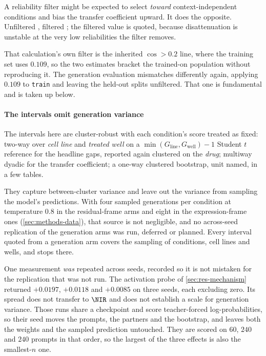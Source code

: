 A reliability filter might be expected to select \emph{toward}
context-in\-de\-pen\-dent conditions and bias the transfer coefficient upward.
It does the opposite. Unfiltered , filtered
; the filtered value is quoted, because disattenuation
is unstable at the very low reliabilities the filter removes.

That calculation's own filter is the inherited $\cos > 0.2$ line, where the
training set uses $0.109$, so the two estimates bracket the trained-on
population without reproducing it. The generation evaluation mismatches
differently again, applying $0.109$ to \texttt{train} and leaving the held-out
splits unfiltered. That one is fundamental and is taken up below.

\paragraph{The intervals omit generation variance} The intervals here are
cluster-robust with each condition's score treated as fixed: two-way over
\emph{cell line} and \emph{treated well} on a $\min(G_{\textrm{line}},
G_{\textrm{well}}) - 1$ Student $t$ reference for the headline gaps, reported
again clustered on the \emph{drug}; multiway dyadic for the transfer
coefficient; a one-way clustered bootstrap, unit named, in a few tables.

They capture between-cluster variance and leave out the variance from sampling
the model's predictions. With four sampled generations per condition at temperature
$0.8$ in the residual-frame arms and eight in the expression-frame ones
(\cref{sec:methods-data}), that source is not negligible, and no across-seed
replication of the generation arms was run, deferred or planned. Every interval
quoted from a generation arm covers the sampling of conditions, cell lines and
wells, and stops there.

One measurement \emph{was} repeated across seeds, recorded so it is not mistaken
for the replication that was not run. The activation probe of
\cref{sec:res-mechanism} returned $+0.0197$, $+0.0118$ and $+0.0085$ on three
seeds, each excluding zero. Its spread does not transfer to $\NIR$ and does not
establish a scale for generation variance. Those runs share a checkpoint and
score teacher-forced log-probabilities, so their seed moves the prompts, the
partners and the bootstrap, and leaves both the weights and the sampled
prediction untouched. They are scored on $60$, $240$ and $240$ prompts in that order, so
the largest of the three effects is also the smallest-$n$ one.

